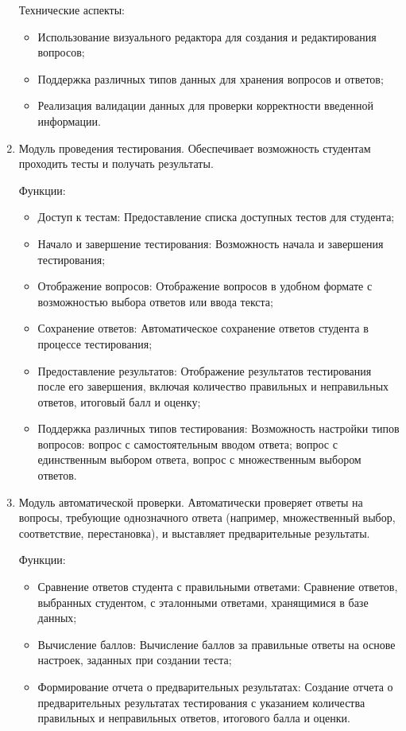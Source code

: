 \begin{enumerate}
	Технические аспекты:
	
	\begin{itemize}
		\item Использование визуального редактора для создания и редактирования вопросов;
		\item Поддержка различных типов данных для хранения вопросов и ответов;
		\item Реализация валидации данных для проверки корректности введенной информации.
	\end{itemize}
	
	\item Модуль проведения тестирования. Обеспечивает возможность студентам проходить тесты и получать результаты.
	
	Функции:
	
	\begin{itemize}
		\item Доступ к тестам: Предоставление списка доступных тестов для студента;
		\item Начало и завершение тестирования: Возможность начала и завершения тестирования;
		\item Отображение вопросов: Отображение вопросов в удобном формате с возможностью выбора ответов или ввода текста;
		\item Сохранение ответов: Автоматическое сохранение ответов студента в процессе тестирования;
		\item Предоставление результатов: Отображение результатов тестирования после его завершения, включая количество правильных и неправильных ответов, итоговый балл и оценку;
		\item Поддержка различных типов тестирования: Возможность настройки типов вопросов: вопрос с самостоятельным вводом ответа; вопрос с единственным выбором ответа, вопрос с множественным выбором ответов.
	\end{itemize}
	
	\item Модуль автоматической проверки. Автоматически проверяет ответы на вопросы, требующие однозначного ответа (например, множественный выбор, соответствие, перестановка), и выставляет предварительные результаты.
	
	Функции:
	
	\begin{itemize}
		\item Сравнение ответов студента с правильными ответами: Сравнение ответов, выбранных студентом, с эталонными ответами, хранящимися в базе данных;
		\item Вычисление баллов: Вычисление баллов за правильные ответы на основе настроек, заданных при создании теста;
		\item Формирование отчета о предварительных результатах: Создание отчета о предварительных результатах тестирования с указанием количества правильных и неправильных ответов, итогового балла и оценки.
	\end{itemize}
	

\end{enumerate}
